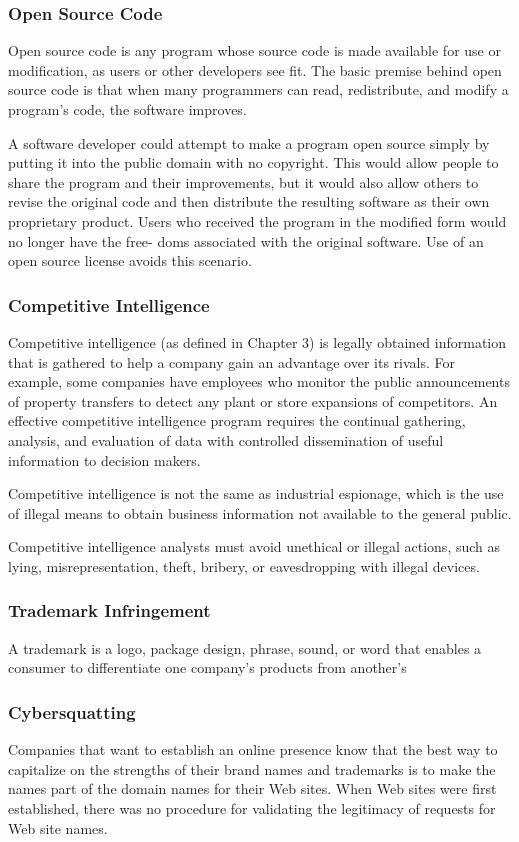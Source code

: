 \documentclass[11pt]{article}
\begin{document}
\subsubsection{Open Source Code}
\label{sec:org16a0933}
Open source code is any program whose source code is made available for use or modification, as users or other developers see fit. The basic premise behind open source code is that when many programmers can read, redistribute, and modify a program’s code, the software improves.

A software developer could attempt to make a program open source simply by putting it into the public domain with no copyright. This would allow people to share the program and their improvements, but it would also allow others to revise the original code and then distribute the resulting software as their own proprietary product. Users who received the program in the modified form would no longer have the free- doms associated with the original software. Use of an open source license avoids this scenario.
\subsubsection{Competitive Intelligence}
\label{sec:org24227d5}
Competitive intelligence (as defined in Chapter 3) is legally obtained information that is gathered to help a company gain an advantage over its rivals. For example, some companies have employees who monitor the public announcements of property transfers to detect any plant or store expansions of competitors. An effective competitive intelligence program requires the continual gathering, analysis, and evaluation of data with controlled dissemination of useful information to decision makers.

Competitive intelligence is not the same as industrial espionage, which is the use of illegal means to obtain business information not available to the general public.

Competitive intelligence analysts must avoid unethical or illegal actions, such as lying,
misrepresentation, theft, bribery, or eavesdropping with illegal devices.
\subsubsection{Trademark Infringement}
\label{sec:org45fc0ce}
A trademark is a logo, package design, phrase, sound, or word that enables a consumer to differentiate one company’s products from another’s
\subsubsection{Cybersquatting}
\label{sec:org1df2c6b}
Companies that want to establish an online presence know that the best way to capitalize on the strengths of their brand names and trademarks is to make the names part of the domain names for their Web sites. When Web sites were first established, there was no procedure for validating the legitimacy of requests for Web site names.
\end{document}
